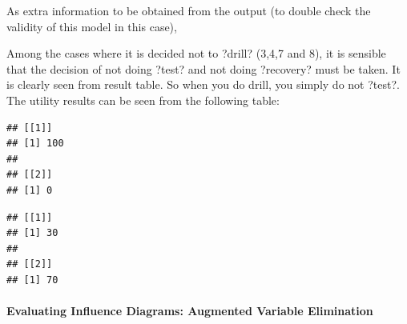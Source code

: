 \documentclass[
]{article}
\newenvironment{Shaded}{\begin{snugshade}}{\end{snugshade}}
\newcommand{\ControlFlowTok}[1]{\textcolor[rgb]{0.13,0.29,0.53}{\textbf{#1}}}
\newcommand{\FunctionTok}[1]{\textcolor[rgb]{0.00,0.00,0.00}{#1}}
\newcommand{\NormalTok}[1]{#1}
\newcommand{\SpecialCharTok}[1]{\textcolor[rgb]{0.00,0.00,0.00}{#1}}
\newcommand{\StringTok}[1]{\textcolor[rgb]{0.31,0.60,0.02}{#1}}
\begin{document}
As extra information to be obtained from the output (to double check the validity of this model in this case),

Among the cases where it is decided not to ?drill? (3,4,7 and 8), it is sensible that the decision of not doing ?test? and not doing ?recovery? must be taken. It is clearly seen from result table.
So when you do drill, you simply do not ?test?. The utility results can be seen from the following table:

\begin{Shaded}
\end{Shaded}

\begin{verbatim}
## [[1]]
## [1] 100
## 
## [[2]]
## [1] 0
\end{verbatim}

\begin{Shaded}
\end{Shaded}

\begin{verbatim}
## [[1]]
## [1] 30
## 
## [[2]]
## [1] 70
\end{verbatim}

\hypertarget{evaluating-influence-diagrams-augmented-variable-elimination}{%
\paragraph{Evaluating Influence Diagrams: Augmented Variable Elimination}\label{evaluating-influence-diagrams-augmented-variable-elimination}}
\end{document}
